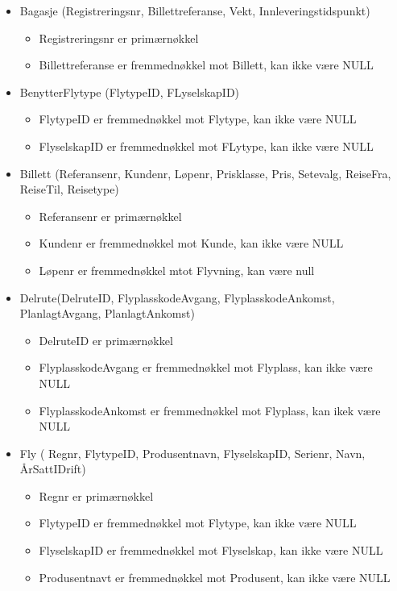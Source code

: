 \documentclass[a4paper,12pt]{article}
\begin{document}
\begin{itemize}

\item Bagasje (Registreringsnr, Billettreferanse, Vekt, Innleveringstidspunkt)
\begin{itemize}
\item Registreringsnr er primærnøkkel
\item Billettreferanse er fremmednøkkel mot Billett, kan ikke være NULL
\end{itemize}

\item BenytterFlytype (FlytypeID, FLyselskapID)
\begin{itemize}
\item FlytypeID er fremmednøkkel mot Flytype, kan ikke være NULL
\item FlyselskapID er fremmednøkkel mot FLytype, kan ikke være NULL
\end{itemize}

\item Billett (Referansenr, Kundenr, Løpenr, Prisklasse, Pris, Setevalg, ReiseFra, ReiseTil, Reisetype)
\begin{itemize}
\item Referansenr er primærnøkkel
\item Kundenr er fremmednøkkel mot Kunde, kan ikke være NULL
\item Løpenr er fremmednøkkel mtot Flyvning, kan være null
\end{itemize}

\item Delrute(DelruteID, FlyplasskodeAvgang, FlyplasskodeAnkomst, PlanlagtAvgang, PlanlagtAnkomst)
\begin{itemize}
\item DelruteID er primærnøkkel
\item FlyplasskodeAvgang er fremmednøkkel mot Flyplass, kan ikke være NULL
\item  FlyplasskodeAnkomst er fremmednøkkel mot Flyplass, kan ikek være NULL
\end{itemize}

\item Fly ( Regnr, FlytypeID, Produsentnavn, FlyselskapID, Serienr, Navn, ÅrSattIDrift)
\begin{itemize}
\item Regnr er primærnøkkel
\item FlytypeID er fremmednøkkel mot Flytype, kan ikke være NULL
\item FlyselskapID er fremmednøkkel mot Flyselskap, kan ikke være NULL
\item Produsentnavt er fremmednøkkel mot Produsent, kan ikke være NULL
\end{itemize}


\end{itemize}
\end{document}
